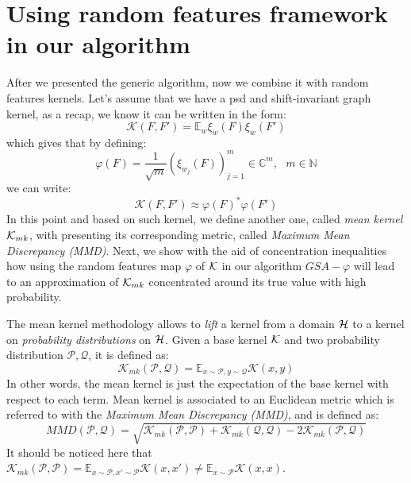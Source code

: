 \section{Using random features framework in our algorithm}
After we presented the generic algorithm, now we combine it with random features kernels.
Let's assume that we have a psd and shift-invariant graph kernel, as a recap, we know it can be written in the form:
\begin{equation}
\label{eq:random_features_3}
\mathcal{K}(F,F')= \mathbb{E}_w \xi_w(F)\xi_w(F')
\end{equation}
which gives that by defining:
\begin{equation}
\varphi(F) = \frac{1}{\sqrt{m}} ( \xi_{w_j}(F) )_{j=1}^m \in \mathbb{C}^m,~~~ m\in \mathbb{N}
\end{equation}
we can write:
\[
\mathcal{K}(F,F')\approx \varphi(F)^*\varphi(F')
\]
In this point and based on such kernel, we define another one, called \emph{mean kernel} $\mathcal{K}_{mk}$, with presenting its corresponding metric, called \emph{Maximum Mean Discrepancy (MMD)}. Next, we show with the aid of concentration inequalities how using the random features map $\varphi$ of $\mathcal{K}$ in  our algorithm $GSA-\varphi$ will lead to an approximation of $\mathcal{K}_{mk}$ concentrated around its true value with high probability.

The mean kernel methodology allows to \emph{lift} a kernel from a domain $\mathcal{H}$ to a kernel on \emph{probability distributions} on $\mathcal{H}$. Given a base kernel $\mathcal{K}$ and two probability distribution $\mathcal{P},\mathcal{Q}$, it is defined as:
\begin{equation}
\label{eq:mean_kernel}
\mathcal{K}_{mk}(\mathcal{P},\mathcal{Q}) = \mathbb{E}_{x \sim \mathcal{P}, y \sim \mathcal{Q}} \mathcal{K}(x,y)
\end{equation}
In other words, the mean kernel is just the expectation of the base kernel with respect to each term. Mean kernel is associated to an Euclidean metric which is referred to with the  \emph{Maximum Mean Discrepancy (MMD)}, and is defined as:
\begin{equation}\label{eq:MMD}
MMD(\mathcal{P},\mathcal{Q}) = \sqrt{\mathcal{K}_{mk}(\mathcal{P},\mathcal{P}) + \mathcal{K}_{mk}(\mathcal{Q},\mathcal{Q}) - 2\mathcal{K}_{mk}(\mathcal{P},\mathcal{Q})}
\end{equation}
It should be noticed here that $\mathcal{K}_{mk}(\mathcal{P},\mathcal{P}) = \mathbb{E}_{x \sim \mathcal{P}, x' \sim \mathcal{P}} \mathcal{K}(x,x') \neq \mathbb{E}_{x \sim \mathcal{P}} \mathcal{K}(x,x)$.

